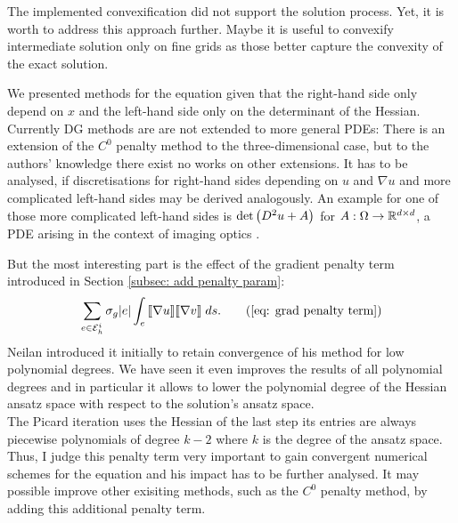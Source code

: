 The implemented convexification did not support the solution process. Yet, it is worth to address this approach further. Maybe it is useful to convexify intermediate solution only on fine grids as those better capture the convexity of the exact solution.

We presented methods for the \MA equation given that the right-hand side only depend on $x$ and the left-hand side only on the determinant of the Hessian. Currently DG methods are are not extended to more general PDEs: There is an extension of the $C^0$ penalty method to the three-dimensional case\cite{BN2012}, but to the authors' knowledge there exist no works on other extensions. It has to be analysed, if  discretisations for right-hand sides depending on $u$ and $\nabla u$ and more complicated left-hand sides may be derived analogously. An example for one of those more complicated left-hand sides is $\det{\left(D^2 u +A\right)}$ for $A:\Omega \rightarrow \mathbb{R}^{d \times d}$, a PDE arising in the context of imaging optics \cite{BHP2014}.
 
But the most interesting part is the effect of the gradient penalty term introduced in Section \ref{subsec: add penalty param}:
\begin{align}
	\sum_{e \in \edgesi} \sigma_g |e |\myIntS e {\jump{ \nabla u} \jump {\nabla v}}. \tag{\ref{eq: grad penalty term}}
\end{align}
Neilan introduced it initially to retain convergence of his method for low polynomial degrees. We have seen it even improves the results of all polynomial degrees and in particular it allows to lower the polynomial degree of the Hessian ansatz space with respect to the solution's ansatz space. \\
The Picard iteration uses the Hessian of the last step its entries are always piecewise polynomials of degree $k-2$ where $k$ is the degree of the ansatz space. Thus, I judge this penalty term very important to gain convergent numerical schemes for the \MA equation and his impact has to be further analysed. It may possible improve other exisiting methods, such as the $C^0$ penalty method, by adding this additional penalty term. 

